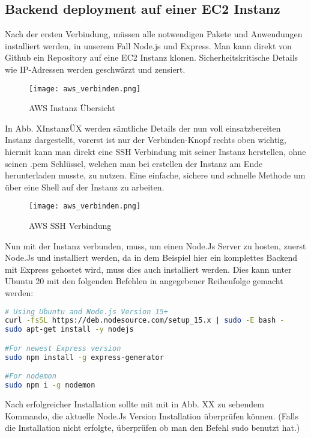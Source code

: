 \subsection{Backend deployment auf einer EC2 Instanz}
Nach der ersten Verbindung, müssen alle notwendigen Pakete und Anwendungen installiert werden, in unserem Fall Node.js und Express. Man kann direkt von Github ein Repository auf eine EC2 Instanz klonen. Sicherheitskritische Details wie IP-Adressen werden geschwärzt und zensiert.

\begin{center}
\begin{figure}[h]
    \centering
    \texttt{[image: aws\_verbinden.png]}
    \caption{AWS Instanz Übersicht}
\end{figure}
\end{center}

In Abb. XInstanzÜX werden sämtliche Details der nun voll einsatzbereiten Instanz dargestellt, vorerst ist nur der Verbinden-Knopf rechts oben wichtig, hiermit kann man direkt eine SSH Verbindung mit seiner Instanz herstellen, ohne seinen .pem Schlüssel, welchen man bei erstellen der Instanz am Ende herunterladen musste, zu nutzen. Eine einfache, sichere und schnelle Methode um über eine Shell auf der Instanz zu arbeiten.

\begin{center}
\begin{figure}[h]
    \centering
    \texttt{[image: aws\_verbinden.png]}
    \caption{AWS SSH Verbindung}
\end{figure}
\end{center}

Nun mit der Instanz verbunden, muss, um einen Node.Js Server zu hosten, zuerst Node.Js und installiert werden, da in dem Beispiel hier ein komplettes Backend mit Express gehostet wird, muss dies auch installiert werden. Dies kann unter Ubuntu 20 mit den folgenden Befehlen in angegebener Reihenfolge gemacht werden:

\begin{lstlisting}[language=bash]
# Using Ubuntu and Node.js Version 15+
curl -fsSL https://deb.nodesource.com/setup_15.x | sudo -E bash -
sudo apt-get install -y nodejs

#For newest Express version
sudo npm install -g express-generator

#For nodemon
sudo npm i -g nodemon
\end{lstlisting}

Nach erfolgreicher Installation sollte mit mit in Abb. XX zu sehendem Kommando, die aktuelle Node.Js Version Installation überprüfen können. (Falls die Installation nicht erfolgte, überprüfen ob man den Befehl sudo benutzt hat.)

